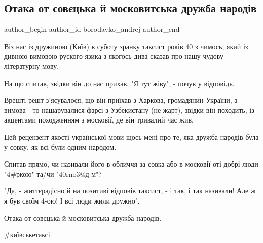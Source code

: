  
 
 
 
 
 
\subsection{Отака от совєцька й московитська дружба народів}
\label{sec:06_09_2021.fb.borodavko_andrej.1.druzhba_narodiv_mova}
 
\ifcmt
 author_begin
   author_id borodavko_andrej
 author_end
\fi

Віз нас із дружиною (Київ) в суботу зранку таксист років 40 з чимось, який із
дивною вимовою руского язика з якогось дива сказав про нашу чудову літературну
мову.

На що спитав, звідки він до нас прихав. "Я тут жіву", - почув у відповідь.

Врешті-решт з'ясувалося, що він приїхав з Харкова, громадянин України, а вимова
- то нашарувалися фарсі з Узбекистану (не жарт), звідки він походить, із
акцентами походженням з московії, де він тривалий час жив.

Цей рецензент якості української мови щось мені про те, яка дружба народів була
у совку, як всі були одним народом.

Спитав прямо, чи називали його в обличчя за совка або в московії оті добрі люди
"4\#ркою" та/чи "40rno3@д-м"?

"Да, - життєрадісно й на позитиві відповів таксист, - і так, і так називали!
Але ж я був своїм 4-ою! І всі люди жили дружно".

Отака от совєцька й московитська дружба народів.

\#київськетаксі

